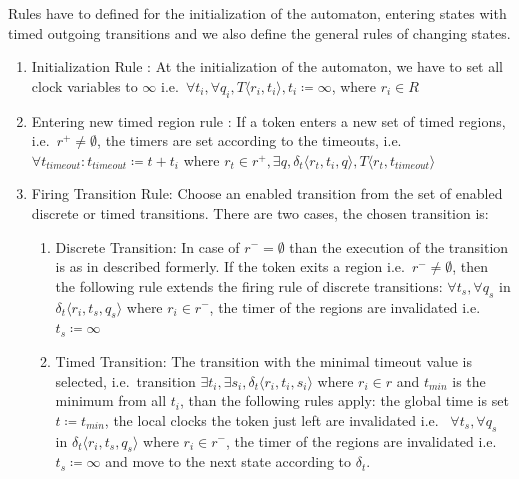 		
			Rules  have to defined for the initialization of the automaton,
			entering states with timed outgoing transitions 
			and we also define the general rules of changing states. 
			
			\begin{enumerate}
				\item Initialization Rule : At the initialization  of the automaton, we have to set all clock variables to $\infty$ 
				i.e.~$\forall t_i, \forall q_i, T \langle r_i, t_i \rangle, t_i \coloneqq \infty $, where $r_i \in R$
			
				\item Entering new timed region rule :
				If a token enters a new set of timed regions, 
				i.e.~$r^+ \neq \emptyset$, 
				the timers are set according to the timeouts, 
				i.e.~$\forall t_{timeout} : t_{timeout} \coloneqq t + t_i $ where $ r_t \in r^+, \exists q ,\delta_t\langle  r_t,t_i,q \rangle, T \langle r_t, t_{timeout} \rangle$
				
				\item Firing Transition Rule: Choose an enabled transition from the set of enabled discrete or timed transitions. 
				There are two cases, the chosen transition is:
					\begin{enumerate}
						\item Discrete Transition: In case of $r^- = \emptyset$ than the execution of the transition is as in described formerly. 
							If the token exits a region i.e.~$r^- \neq \emptyset$, 
							then the following rule extends the firing rule of discrete transitions:
							$\forall t_s, \forall q_s$ in $ \delta_t \langle r_i, t_s, q_s \rangle$ where $r_i \in r^-$, the timer of the regions are invalidated i.e.~	$t_s \coloneqq \infty$
						\item Timed Transition: The transition with the minimal timeout value is selected, 
							 i.e.~transition $\exists t_i, \exists s_i, \delta_t \langle r_i, t_i, s_i \rangle$ where $ r_i \in r$ and $t_{min}$ is the minimum from all $t_i$,
							 than the following rules apply:
							 the global time is set $t \coloneqq t_{min}$, 
							 the local clocks the token just left are invalidated i.e.~
							 $\forall t_s, \forall q_s$ in $ \delta_t \langle r_i, t_s, q_s \rangle$ where $r_i \in r^-$, the timer of the regions are invalidated i.e.~$t_s \coloneqq \infty$ 
							 and move to the next state according to $\delta_t$.
					\end{enumerate}			
			\end{enumerate}
			
